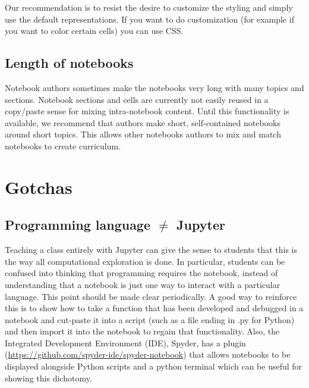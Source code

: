 \documentclass[]{book}
\begin{document}
Our recommendation is to resist the desire to customize the styling and
simply use the default representations. If you want to do customization
(for example if you want to color certain cells) you can use CSS.

\subsection{Length of notebooks}\label{length-of-notebooks}

Notebook authors sometimes make the notebooks very long with many topics
and sections. Notebook sections and cells are currently not easily
reused in a copy/paste sense for mixing intra-notebook content. Until
this functionality is available, we recommend that authors make short,
self-contained notebooks around short topics. This allows other
notebooks authors to mix and match notebooks to create curriculum.

\section{Gotchas}\label{gotchas}

\subsection{\texorpdfstring{Programming language \(\neq\)
Jupyter}{Programming language \textbackslash{}neq Jupyter}}\label{programming-language-neq-jupyter}

Teaching a class entirely with Jupyter can give the sense to students
that this is the way all computational exploration is done. In
particular, students can be confused into thinking that programming
requires the notebook, instead of understanding that a notebook is just
one way to interact with a particular language. This point should be
made clear periodically. A good way to reinforce this is to show how to
take a function that has been developed and debugged in a notebook and
cut-paste it into a script (such as a file ending in .py for Python) and
then import it into the notebook to regain that functionality. Also, the
Integrated Development Environment (IDE), Spyder, has a plugin
(\url{https://github.com/spyder-ide/spyder-notebook}) that allows
notebooks to be displayed alongside Python scripts and a python terminal
which can be useful for showing this dichotomy.
\end{document}
